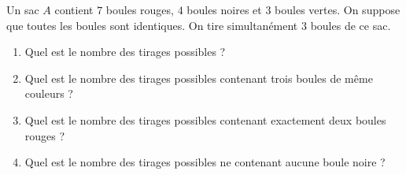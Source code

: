 \documentclass[12pt,a4paper,dvipsnames,svgnames,x11names,table]{article}
\begin{document}
 \begin{myboxe11}{}
  \bccrayon Un sac $A$ contient $7$ boules rouges, $4$ boules noires et $3$ boules vertes. On suppose que toutes les boules sont identiques.
On tire simultanément $3$ boules de ce sac.
\begin{enumerate}
\item Quel est le nombre des tirages possibles ? 
\item Quel est le nombre des tirages possibles contenant trois boules de  même couleurs ? 
\item Quel est le nombre des tirages possibles contenant exactement deux boules rouges ? 
\item Quel est le nombre des tirages possibles ne contenant aucune boule noire ?
\end{enumerate}
\end{myboxe11}
 
\end{document}
